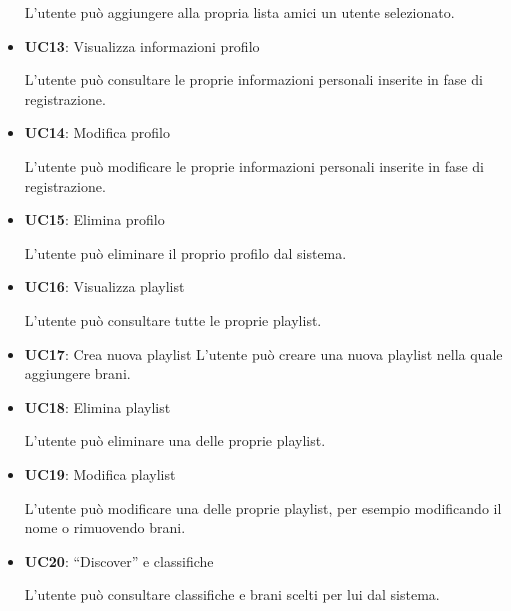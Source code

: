 \begin{itemize}
      L'utente può aggiungere alla propria lista amici un utente selezionato.
      \item \textbf{UC13}: Visualizza informazioni profilo 
      
      L'utente può consultare le proprie informazioni personali inserite in fase di registrazione.
      \item \textbf{UC14}: Modifica profilo 
      
      L'utente può modificare le proprie informazioni personali inserite in fase di registrazione.
      \item \textbf{UC15}: Elimina profilo 
      
      L'utente può eliminare il proprio profilo dal sistema.
      \item \textbf{UC16}: Visualizza playlist 
      
      L'utente può consultare tutte le proprie playlist.
      \item \textbf{UC17}: Crea nuova playlist L'utente può creare una nuova playlist nella
            quale aggiungere brani.
      \item \textbf{UC18}: Elimina playlist 
      
      L'utente può eliminare una delle proprie playlist.
      \item \textbf{UC19}: Modifica playlist 
      
      L'utente può modificare una delle proprie playlist, per esempio modificando il nome o rimuovendo brani.
      \item \textbf{UC20}: ``Discover'' e classifiche 
      
      L'utente può consultare classifiche e brani scelti per lui dal sistema.

\end{itemize}

